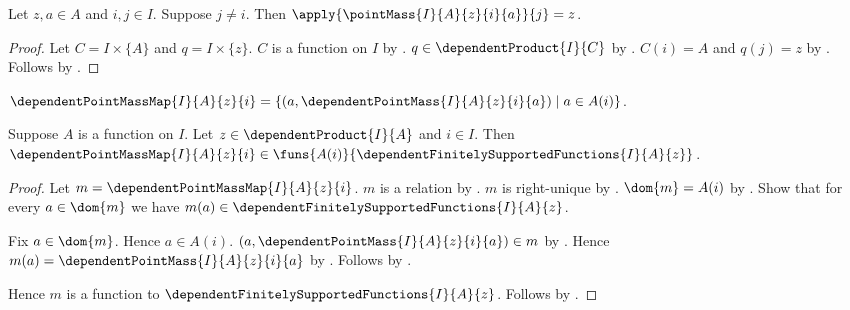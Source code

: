 \begin{proposition}\label{point_mass_other}
    Let $z,a\in A$ and $i,j\in I$.
    Suppose $j\neq i$.
    Then $\apply{\pointMass{I}{A}{z}{i}{a}}{j}=z$.
\end{proposition}
\begin{proof}
    Let $C=I\times\{A\}$ and $q=I\times\{z\}$.
    $C$ is a function on $I$ by
        .
    $q\in\dependentProduct{I}{C}$ by
        .
    $C(i)=A$ and $q(j)=z$ by
        .
    Follows by
        .
\end{proof}

\begin{definition}\label{dependent_point_mass_map}
    $\dependentPointMassMap{I}{A}{z}{i}
        =\{(a,\dependentPointMass{I}{A}{z}{i}{a})\mid a\in A(i)\}$.
\end{definition}

\begin{proposition}\label{dependent_point_mass_map_type}
    Suppose $A$ is a function on $I$.
    Let $z\in\dependentProduct{I}{A}$ and $i\in I$.
    Then
        $\dependentPointMassMap{I}{A}{z}{i}
            \in\funs{A(i)}{
                \dependentFinitelySupportedFunctions{I}{A}{z}}$.
\end{proposition}
\begin{proof}
    Let $m=\dependentPointMassMap{I}{A}{z}{i}$.
    $m$ is a relation by
        .
    $m$ is right-unique by
        .
    $\dom{m}=A(i)$ by
        .
    Show that for every $a\in\dom{m}$ we have
        $m(a)\in\dependentFinitelySupportedFunctions{I}{A}{z}$.
    \begin{subproof}
        Fix $a\in\dom{m}$.
        Hence $a\in A(i)$.
        $(a,\dependentPointMass{I}{A}{z}{i}{a})\in m$ by
            .
        Hence
            $m(a)=\dependentPointMass{I}{A}{z}{i}{a}$ by
            .
        Follows by
            .
    \end{subproof}
    Hence $m$ is a function to
        $\dependentFinitelySupportedFunctions{I}{A}{z}$.
    Follows by .
\end{proof}

